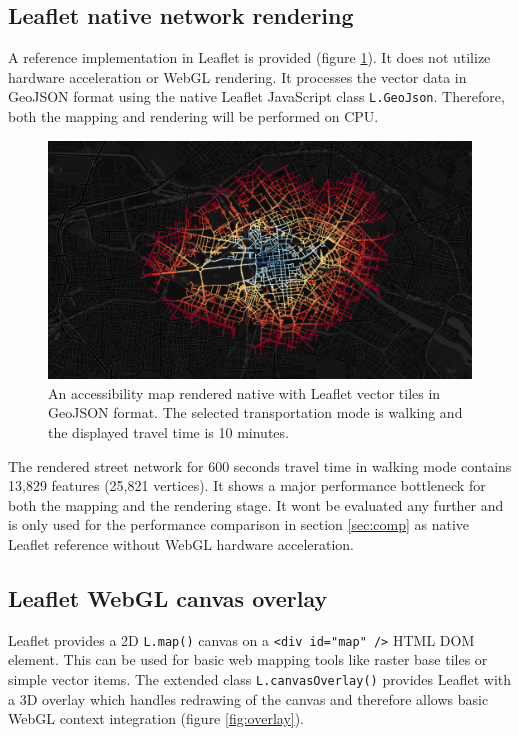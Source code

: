     \subsection{Leaflet native network rendering}
      A reference implementation in Leaflet is provided (figure \ref{fig:poc:one}). It does not utilize hardware acceleration or WebGL rendering. It processes the vector data in GeoJSON format using the native Leaflet JavaScript class \texttt{L.GeoJson}. Therefore, both the mapping and rendering will be performed on CPU.\par
      \begin{figure}[h]
        \centering
        \includegraphics[width=0.7\linewidth]{./img/screenshot-poc1-600s-native.png}
        \caption{An accessibility map rendered native with Leaflet vector tiles in GeoJSON format. The selected transportation mode is walking and the displayed travel time is 10 minutes.}
        \label{fig:poc:one}
      \end{figure}
      The rendered street network for 600 seconds travel time in walking mode contains 13,829 features (25,821 vertices). It shows a major performance bottleneck for both the mapping and the rendering stage. It wont be evaluated any further and is only used for the performance comparison in section \ref{sec:comp} as native Leaflet reference without WebGL hardware acceleration.

    \subsection{Leaflet WebGL canvas overlay}
      Leaflet provides a 2D \texttt{L.map()} canvas on a \texttt{<div id="map" />} HTML DOM element. This can be used for basic web mapping tools like raster base tiles or simple vector items. The extended class \texttt{L.canvasOverlay()} provides Leaflet with a 3D overlay which handles redrawing of the canvas and therefore allows basic WebGL context integration (figure \ref{fig:overlay}).

